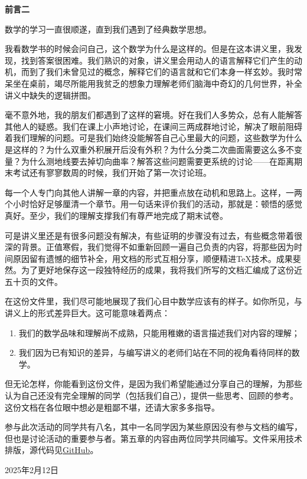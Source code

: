 \documentclass{main}
\theoremstyle{definition}
\newenvironment{preface}[1][前言]{
    \newpage
    \vspace*{\stretch{2}}
    {\noindent \bfseries \Huge #1}
    \begin{center}
        \phantomsection \addcontentsline{toc}{chapter}{#1}
        \thispagestyle{plain}
    \end{center}

}
{\vspace*{\stretch{5}}}
\begin{document}
\begin{preface}[前言二]
    数学的学习一直很顺遂，直到我们遇到了经典数学思想。

    我看数学书的时候会问自己，这个数学为什么是这样的。但是在\cite{cmt}这本讲义里，我发现，找到答案很困难。我们熟识的对象，讲义里会用动人的语言解释它们产生的动机，而到了我们未曾见过的概念，解释它们的语言就和它们本身一样玄妙。我时常呆坐在桌前，竭尽所能用我贫乏的想象力理解老师们脑海中奇幻的几何世界，补全讲义中缺失的逻辑拼图。

    毫不意外地，我的朋友们都遇到了这样的窘境。好在我们人多势众，总有人能解答其他人的疑惑。我们在课上小声地讨论，在课间三两成群地讨论，解决了眼前阻碍着我们理解的问题。可是我们始终没能解答自己心里最大的问题，这些数学为什么是这样的？为什么双重外积展开后没有外积？为什么分类二次曲面需要这么多不变量？为什么测地线要去掉切向曲率？解答这些问题需要更系统的讨论——在距离期末考试还有寥寥数周的时候，我们开始了第一次讨论班。

    每一个人专门向其他人讲解一章的内容，并把重点放在动机和思路上。这样，一两个小时恰好足够厘清一个章节。用一句话来评价我们的活动，那就是：顿悟的感觉真好。至少，我们的理解支撑我们有尊严地完成了期末试卷。

    可是讲义里还是有很多问题没有解决，有些证明的步骤没有过去，有些概念带着很深的背景。正值寒假，我们觉得不如重新回顾一遍自己负责的内容，将那些因为时间原因留有遗憾的细节补全，用文档的形式互相分享，顺便精进\TeX 技术。成果斐然。为了更好地保存这一段独特经历的成果，我将我们所写的文档汇编成了这份近五十页的文件。

    在这份文件里，我们尽可能地展现了我们心目中数学应该有的样子。如你所见，与讲义上的形式差异巨大。这可能意味着两点：
    \begin{enumerate}
        \item 我们的数学品味和理解尚不成熟，只能用稚嫩的语言描述我们对内容的理解；
        \item 我们因为已有知识的差异，与编写讲义的老师们站在不同的视角看待同样的数学。
    \end{enumerate}
    但无论怎样，你能看到这份文件，是因为我们希望能通过分享自己的理解，为那些认为自己还没有完全理解的同学（包括我们自己），提供一些思考、回顾的参考。这份文档在各位眼中想必是粗鄙不堪，还请大家多多指导。

    参与此次活动的同学共有八名，其中一名同学因为某些原因没有参与文档的编写，但也是讨论活动的重要参与者。第五章的内容由两位同学共同编写。文件采用\LaTeXe 技术排版，源代码见\href{https://github.com/MrNullbody/classical-mathematical-thoughts}{GitHub}。
    \begin{flushright}
        2025年2月12日
    \end{flushright}
\end{preface}
\tableofcontents
\newpage
{}
\setcounter{page}{1}
\pagestyle{fancy}
\fancyhead[RO,LE]{\thepage}
\fancyhead[RE]{\rightmark}








\end{document}

